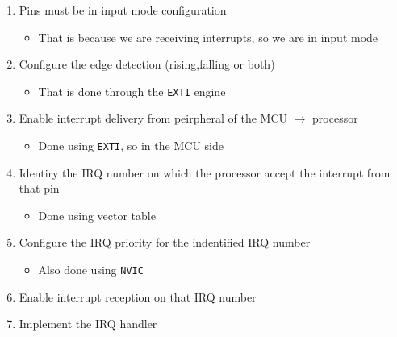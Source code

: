 \begin{enumerate}

\item Pins must be in input mode configuration

	\begin{itemize}
	\item That is because we are receiving interrupts, so we are in input mode
	\end{itemize}

\item Configure the edge detection (rising,falling or both)
	
		\begin{itemize}
		\item That is done through the \verb|EXTI| engine
		\end{itemize}

\item Enable interrupt delivery from peirpheral of the MCU $\rightarrow$ processor


	\begin{itemize}
	\item Done using \verb|EXTI|, so in the MCU side
	\end{itemize}

\item Identiry the IRQ number on which the processor accept the interrupt from that pin

	\begin{itemize}
	\item Done using vector table
	\end{itemize}

\item Configure the IRQ priority for the indentified IRQ number 

	\begin{itemize}
	\item Also done using \verb|NVIC|
	\end{itemize}

\item Enable interrupt reception on that IRQ number 

\item Implement the IRQ handler

\end{enumerate}





